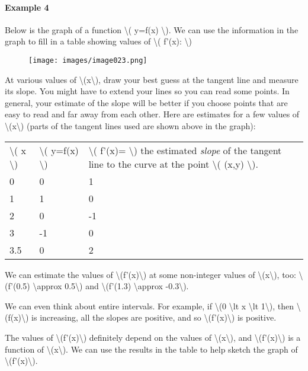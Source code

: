 \hypertarget{example-4}{%
\paragraph{Example 4}\label{example-4}}

Below is the graph of a function \textbackslash{}( y=f(x)
\textbackslash{}). We can use the information in the graph to fill in a
table showing values of \textbackslash{}( f'(x): \textbackslash{})

\begin{figure}
\centering
\texttt{[image: images/image023.png]}
\caption{}
\end{figure}

At various values of \textbackslash{}(x\textbackslash{}), draw your best
guess at the tangent line and measure its slope. You might have to
extend your lines so you can read some points. In general, your estimate
of the slope will be better if you choose points that are easy to read
and far away from each other. Here are estimates for a few values of
\textbackslash{}(x\textbackslash{}) (parts of the tangent lines used are
shown above in the graph):

\begin{longtable}[]{@{}lll@{}}
\toprule
\endhead
\textbackslash{}( x \textbackslash{}) & \textbackslash{}( y=f(x)
\textbackslash{}) & \textbackslash{}( f'(x)= \textbackslash{}) the
estimated \emph{slope} of the tangent line to the curve at the point
\textbackslash{}( (x,y) \textbackslash{}).\tabularnewline
0 & 0 & 1\tabularnewline
1 & 1 & 0\tabularnewline
2 & 0 & -1\tabularnewline
3 & -1 & 0\tabularnewline
3.5 & 0 & 2\tabularnewline
\bottomrule
\end{longtable}

We can estimate the values of \textbackslash{}(f'(x)\textbackslash{}) at
some non-integer values of \textbackslash{}(x\textbackslash{}), too:
\textbackslash{}(f'(0.5) \textbackslash{}approx 0.5\textbackslash{}) and
\textbackslash{}(f'(1.3) \textbackslash{}approx -0.3\textbackslash{}).

We can even think about entire intervals. For example, if
\textbackslash{}(0 \textbackslash{}lt x \textbackslash{}lt
1\textbackslash{}), then \textbackslash{}(f(x)\textbackslash{}) is
increasing, all the slopes are positive, and so
\textbackslash{}(f'(x)\textbackslash{}) is positive.

The values of \textbackslash{}(f'(x)\textbackslash{}) definitely depend
on the values of \textbackslash{}(x\textbackslash{}), and
\textbackslash{}(f'(x)\textbackslash{}) is a function of
\textbackslash{}(x\textbackslash{}). We can use the results in the table
to help sketch the graph of \textbackslash{}(f'(x)\textbackslash{}).

